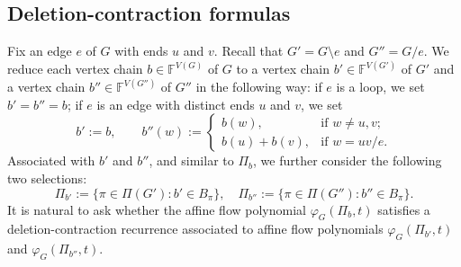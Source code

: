\documentclass[12pt]{article}%
\renewcommand*{\bm}[1]{#1}%
\numberwithin{equation}{section}
\begin{document}
\subsection{Deletion-contraction formulas}\label{Sec3-2}
Fix an edge $e$ of $G$ with ends $u$ and $v$. Recall that $G' = G\setminus e$ and $G'' = G/e$. We reduce each vertex chain $\bm b\in\mathbb{F}^{V(G)}$ of $G$ to a vertex chain $\bm b'\in\mathbb{F}^{V(G')}$ of $G'$ and a vertex chain $\bm b''\in\mathbb{F}^{V(G'')}$ of $G''$ in the following way: if $e$ is a loop, we set $\bm b'=\bm b''=\bm b$; if $e$ is an edge with distinct ends $u$ and $v$, we set
\[
\bm b':=\bm b,\quad\quad
\bm b''(w):=
\begin{cases}
\bm b(w), &\text{if } w\ne u,v;\\
\bm b(u)+\bm b(v), & \text{if } w=uv/e.
\end{cases}
\]
Associated with $\bm b'$ and $\bm b''$, and similar to $\Pi_{\bm b}$, we further consider the following two selections:
\[
\Pi_{\bm b'}:=\big\{\pi\in\Pi(G'):\bm b'\in B_\pi\big\},\quad \Pi_{\bm b''}:=\big\{\pi\in\Pi(G''):\bm b''\in B_\pi\big\}.
\]
It is natural to ask whether the affine flow polynomial $\varphi_G(\Pi_{\bm b},t)$ satisfies a deletion-contraction recurrence associated to affine flow polynomials $\varphi_G(\Pi_{\bm b'},t)$ and $\varphi_G(\Pi_{\bm b''},t)$. 
\end{document}
